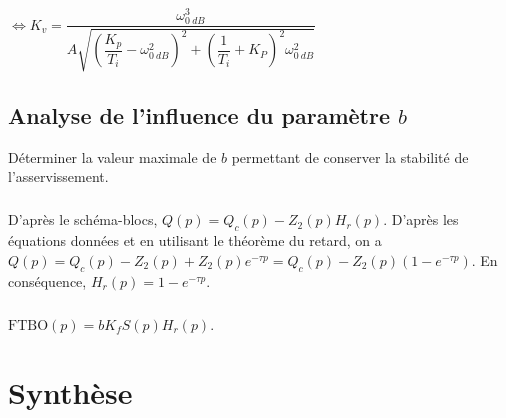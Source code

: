 \documentclass[10pt,fleqn]{article} %
\begin{document}
$\Leftrightarrow 
K_v  =\dfrac{\omega_{\SI{0}{dB}}^3}{A\sqrt{\left(\dfrac{K_p}{T_i }-\omega_{\SI{0}{dB}}^2 \right)^2+\left(\dfrac{1}{T_i}+ K_P\right)^2\omega_{\SI{0}{dB}}^2}}$


\subsection{Analyse de l’influence du paramètre $b$}
\begin{obj}
Déterminer la valeur maximale de $b$ permettant de conserver la stabilité de l’asservissement.
\end{obj}



\subparagraph{}

D'après le schéma-blocs, $Q(p)=Q_c(p)-Z_2(p)H_r(p)$. 
D'après les équations données et en utilisant le théorème du retard, on a $Q(p)=Q_c(p)-Z_2(p)+Z_2(p)e^{-\tau p}=Q_c(p)-Z_2(p)\left(1-e^{-\tau p}\right)$. En conséquence, $H_r(p)=1-e^{-\tau p}$.


\subparagraph{}
$\text{FTBO}(p)=bK_f S(p)H_r(p)$.

\subparagraph{}

\section{Synthèse}

\subparagraph{}
\end{document}
